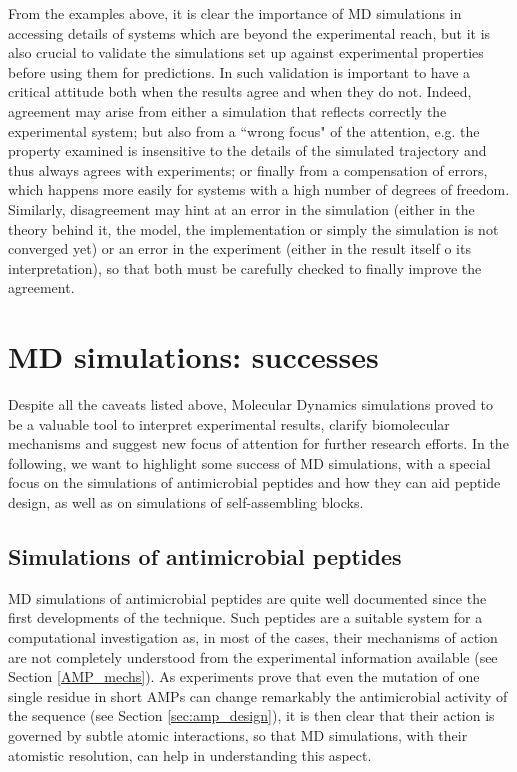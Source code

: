 From the examples above, it is clear the importance of MD simulations in accessing details of systems which are beyond the experimental reach, but it is also crucial to validate the simulations set up against experimental properties before using them for predictions.
%
In such validation is important to have a critical attitude both when the results agree and when they do not.
%
Indeed, agreement may arise from either a simulation that reflects correctly the experimental system; but also from a ``wrong focus" of the attention, e.g. the property examined is insensitive to the details of the simulated trajectory and thus always agrees with experiments; or finally from a compensation of errors, which happens more easily for systems with a high number of degrees of freedom.
%
Similarly, disagreement may hint at an error in the simulation (either in the theory behind it, the model, the implementation or simply the simulation is not converged yet) or an error in the experiment (either in the result itself o its interpretation), so that both must be carefully checked to finally improve the agreement.


\section{MD simulations: successes} \label{sec:md_lit}

Despite all the caveats listed above, Molecular Dynamics simulations proved to be a valuable tool to interpret experimental results, clarify biomolecular mechanisms and suggest new focus of attention for further research efforts.
%
In the following, we want to highlight some success of MD simulations, with a special focus on the simulations of antimicrobial peptides and how they can aid peptide design, as well as on simulations of self-assembling blocks.


\subsection{Simulations of antimicrobial peptides}
MD simulations of antimicrobial peptides are quite well documented since the first developments of the technique. Such peptides are a suitable system for a computational investigation as, in most of the cases, their mechanisms of action are not completely understood from the experimental information available (see Section \ref{AMP_mechs}). As experiments prove that even the mutation of one single residue in short AMPs can change remarkably the antimicrobial activity of the sequence (see Section \ref{sec:amp_design}), it is then clear that their action is governed by subtle atomic interactions, so that MD simulations, with their atomistic resolution, can help in understanding this aspect.

